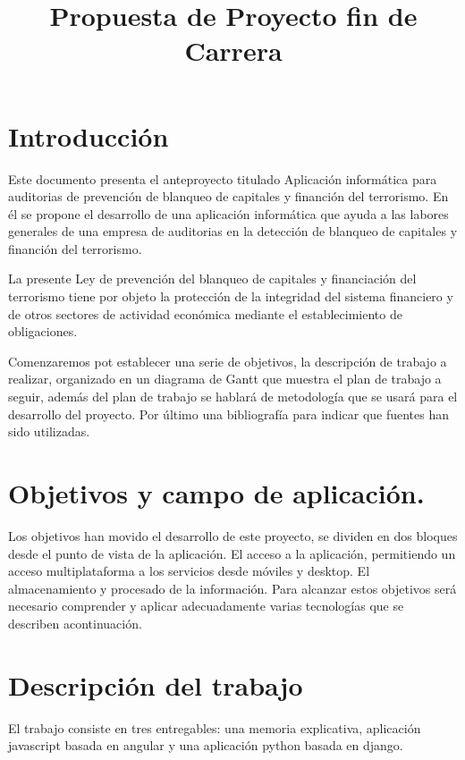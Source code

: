 \documentclass{article}
\begin{document}
\title{Propuesta de Proyecto fin de Carrera}
\setcounter{page}{2}
\cleardoublepage

\setcounter{tocdepth}{2}
\tableofcontents
\listoffixmes


\section{Introducción}
Este documento presenta el anteproyecto titulado Aplicación informática para auditorias de prevención de blanqueo de capitales y financión del terrorismo. En él se propone el desarrollo de una aplicación informática que ayuda a las labores generales de una empresa de auditorias en la detección de blanqueo de capitales y financión del terrorismo.

La presente Ley de prevención del blanqueo de capitales y financiación del terrorismo tiene por objeto la protección de la integridad del sistema financiero y de otros sectores de actividad económica mediante el establecimiento de obligaciones.

Comenzaremos pot establecer una serie de objetivos, la descripción de trabajo a realizar, organizado en un diagrama de Gantt que muestra el plan de trabajo a seguir, además del plan de trabajo se hablará de metodología que se usará para el desarrollo del proyecto.
Por último una bibliografía para indicar que fuentes han sido utilizadas.  


 


\section{Objetivos y campo de aplicación.}
Los objetivos han movido el desarrollo de este proyecto, se dividen en dos bloques desde el punto de vista de la aplicación. El acceso a la aplicación, permitiendo un acceso multiplataforma a los servicios desde móviles y desktop. El almacenamiento y procesado de la información. 
Para alcanzar estos objetivos será necesario comprender y aplicar adecuadamente varias tecnologías que se describen acontinuación.



\section{Descripción del trabajo}
El trabajo consiste en tres entregables: una memoria explicativa, aplicación javascript basada en angular y una aplicación python basada en django.
\end{document}
